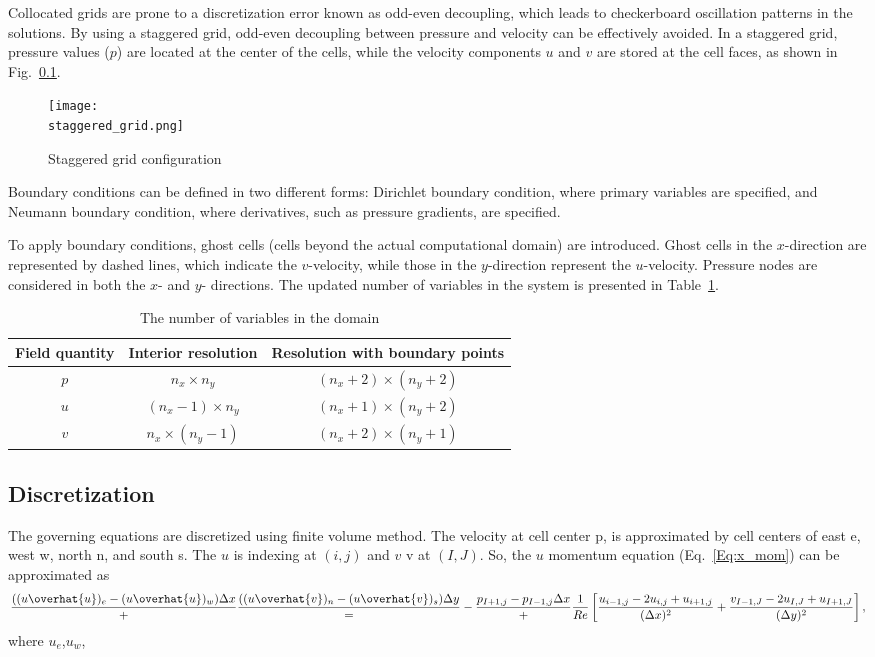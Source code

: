 \documentclass{article}
\numberwithin{equation}{section}
\numberwithin{figure}{section}
\begin{document}
Collocated grids are prone to a discretization error known as odd-even 
decoupling, which leads to checkerboard oscillation patterns in the solutions. By 
using a staggered grid, odd-even decoupling between pressure and velocity can be 
effectively avoided. In a staggered grid, pressure values (\( p \)) are located at the 
center of the cells, while the velocity components \( u \) and \( v \) are stored at the cell 
faces, as shown in Fig.~\ref{}.
\begin{figure}
    \texttt{[image: \\staggered\_grid.png]}
    \caption{Staggered grid configuration}
\end{figure}

Boundary conditions can be defined in two different forms: 
Dirichlet boundary condition, where primary variables are specified, and 
Neumann boundary condition, where derivatives, such as pressure gradients, are specified. 

To apply boundary conditions, ghost cells (cells beyond the actual computational domain) 
are introduced. Ghost cells in the \( x \)-direction are represented by dashed lines, 
which indicate the \( v \)-velocity, while those in the \( y \)-direction represent 
the \( u \)-velocity. Pressure nodes are considered in both the \( x \)- and \( y \)-
directions. The updated number of variables in the system is presented in Table~\ref{tab:variables}.

\begin{table}
    \centering
    \caption{The number of variables in the domain}
    \label{tab:variables}
    \begin{tabular}{c c c}
        \toprule
        Field quantity & Interior resolution   & Resolution with boundary points \\
        \midrule
        $p$             & $n_x \times n_y$      & $(n_x +2)\times(n_y +2)$         \\
        $u$             & $(n_x -1) \times n_y$ & $(n_x+1)\times(n_y +2) $        \\
        $v$             & $n_x \times (n_y -1)$ & $(n_x +2)\times(n_y +1)$         \\
        \bottomrule        
    \end{tabular}
\end{table}

\subsection{Discretization}
The governing equations are discretized using finite volume method. The velocity at cell center p, is approximated 
by cell centers of east e, west w, north n, and south s. The $u$  is indexing at $(i,j)$ and $v$ v at $(I,J)$. So, the $u$ momentum 
equation (Eq.~\ref{Eq:x_mom}) can be approximated as
\begin{equation}
    \frac{((u \overhat{u})_e -(u \overhat{u})_w){\Delta x}}+\frac{((u \overhat{v})_n -(u \overhat{v})_s){\Delta y}}
    = -\frac{p_{I+1,j}-p_{I-1,j}{\Delta x}}  +  \frac{1}{Re} \left [\frac{u_{i-1,j}-2u_{i,j}+u_{i+1,j}}{(\Delta x)^2} + \frac{v_{I-1,J}-2u_{I,J}+u_{I+1,J}}{(\Delta y)^2}\right ],
\end{equation}
where $u_e$,$u_w$,
\end{document}
